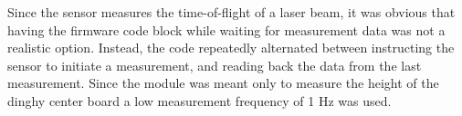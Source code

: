 Since the sensor measures the time-of-flight of a laser beam, it was obvious that having the firmware code block while waiting for measurement data was not a realistic option. Instead, the code repeatedly alternated between instructing the sensor to initiate a measurement, and reading back the data from the last measurement. Since the module was meant only to measure the height of the dinghy center board a low measurement frequency of 1 Hz was used.
